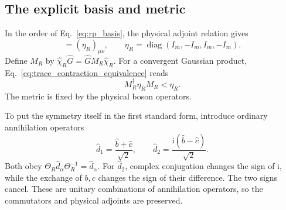 \documentclass[11pt,a4paper]{article}
\newcommand{\diag}{\operatorname{diag}}
\newcommand{\ii}{\mathrm i}
\numberwithin{equation}{section}
\begin{document}
\subsection{The explicit basis and metric}

In the order of Eq.~\eqref{eq:rp_basis}, the physical adjoint relation
gives
\begin{equation}
 [(\hat\chi_R)_\mu,(\hat\chi_R)_\nu^\dagger]
 =(\eta_R)_{\mu\nu},\qquad
 \boxed{\eta_R=\diag(I_m,-I_m,I_m,-I_m).}
 \label{eq:rp_metric}
\end{equation}
Define $M_R$ by $\hat\chi_R\hat G=\hat G M_R\hat\chi_R$.
For a convergent Gaussian product,
Eq.~\eqref{eq:trace_contraction_equivalence} reads
\begin{equation}
 \boxed{M_R^\dagger\eta_R M_R<\eta_R.}
 \label{eq:rp_contraction}
\end{equation}
The metric is fixed by the physical boson operators.

To put the symmetry itself in the first standard form, introduce ordinary
annihilation operators
\begin{equation}
 \boxed{\hat d_1=\frac{\hat b+\hat c}{\sqrt2},\qquad
        \hat d_2=\frac{\ii(\hat b-\hat c)}{\sqrt2}.}
 \label{eq:rp_d_modes}
\end{equation}
Both obey $\Theta_R\hat d_\alpha\Theta_R^{-1}=\hat d_\alpha$.
For $\hat d_2$, complex conjugation changes the sign of $\ii$, while
the exchange of $b,c$ changes the sign of their difference. The two
signs cancel. These are unitary combinations of annihilation operators,
so the commutators and physical adjoints are preserved.
\end{document}
